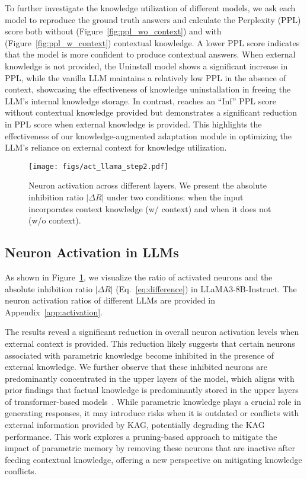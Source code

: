 To further investigate the knowledge utilization of different models, we ask each model to reproduce the ground truth answers and calculate the Perplexity (PPL) score both without (Figure~\ref{fig:ppl_wo_context}) and with (Figure~\ref{fig:ppl_w_context}) contextual knowledge. A lower PPL score indicates that the model is more confident to produce contextual answers. When external knowledge is not provided, the Uninstall model shows a significant increase in PPL, while the vanilla LLM maintains a relatively low PPL in the absence of context, showcasing the effectiveness of knowledge uninstallation in freeing the LLM's internal knowledge storage. In contrast, \method{} reaches an ``Inf'' PPL score without contextual knowledge provided but demonstrates a significant reduction in PPL score when external knowledge is provided. This highlights the effectiveness of our knowledge-augmented adaptation module in optimizing the LLM's reliance on external context for knowledge utilization.


\begin{figure}[t!]
    \centering
    \texttt{[image: figs/act\_llama\_step2.pdf]}
    \caption{Neuron activation across different layers. We present the absolute inhibition ratio $|\Delta R|$ under two conditions: when the input incorporates context knowledge (w/ context) and when it does not (w/o context).}
    \label{fig:llama3-8b-neuron_activation}
\end{figure}


\subsection{Neuron Activation in LLMs} 
As shown in Figure~\ref{fig:llama3-8b-neuron_activation}, we visualize the ratio of activated neurons and the absolute inhibition ratio $
|\Delta R|$ (Eq.~\ref{eq:difference}) in LLaMA3-8B-Instruct. The neuron activation ratios of different LLMs are provided in Appendix~\ref{app:activation}.

The results reveal a significant reduction in overall neuron activation levels when external context is provided. This reduction likely suggests that certain neurons associated with parametric knowledge become inhibited in the presence of external knowledge. We further observe that these inhibited neurons are predominantly concentrated in the upper layers of the model, which aligns with prior findings that factual knowledge is predominantly stored in the upper layers of transformer-based models~\cite{geva2020transformer,wang2024knowledge}. 
While parametric knowledge plays a crucial role in generating responses, it may introduce risks when it is outdated or conflicts with external information provided by KAG, potentially degrading the KAG performance. This work explores a pruning-based approach to mitigate the impact of parametric memory by removing these neurons that are inactive after feeding contextual knowledge, offering a new perspective on mitigating knowledge conflicts.
